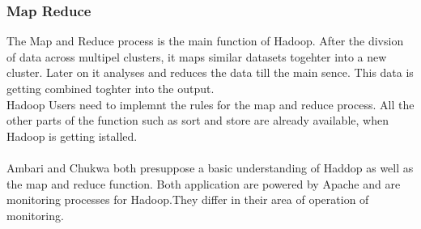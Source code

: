 \subsubsection*{Map Reduce}
The Map and Reduce process is the main function of Hadoop. After the divsion of data across multipel clusters, it maps similar datasets togehter into a new cluster. Later on it analyses and reduces the data till the main sence. This data is getting combined toghter into the output. 
\\
Hadoop Users need to implemnt the rules for the map and reduce process. All the other parts of the function such as sort and store are already available, when Hadoop is getting istalled.
\\
\\
Ambari and Chukwa both presuppose a basic understanding of Haddop as well as the map and reduce function. Both application are powered by Apache and are monitoring processes for Hadoop.They differ in their area of operation of monitoring. 